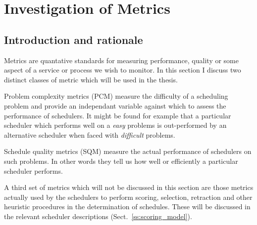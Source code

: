 \section{Investigation of Metrics}
\label{sect:metrics}

\subsection{Introduction and rationale}
Metrics are quantative standards for measuring performance, quality or some aspect of a service or process we wish to monitor. In this section I discuss two distinct classes of metric which will be used in the thesis. 

Problem complexity metrics (PCM) measure the difficulty of a scheduling problem and provide an independant variable against which to assess the performance of schedulers. It might be found for example that a particular scheduler which performs well on a \emph{easy} problems is out-performed by an alternative scheduler when faced with \emph{difficult} problems. 

Schedule quality metrics (SQM) measure the actual performance of schedulers on such problems. In other words they tell us how well or efficiently a particular scheduler performs.

A third set of metrics which will not be discussed in this section are those metrics actually used by the schedulers to perform scoring, selection, retraction and other heuristic procedures in the determination of schedules. These will be discussed in the relevant scheduler descriptions (Sect.~\ref{ss:scoring_model}).

